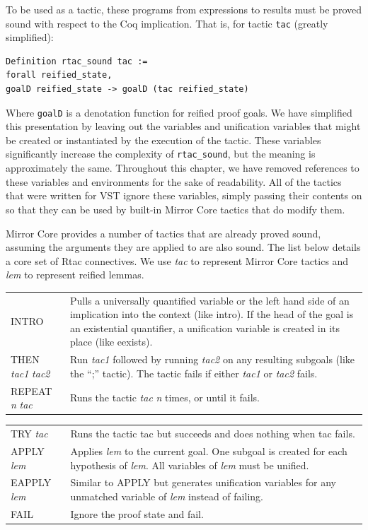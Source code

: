 \documentclass{puthesis}
\begin{document}
To be used as a tactic, these programs from expressions to results
must be proved sound with respect to the Coq implication. That is, for
tactic \lstinline|tac| (greatly simplified):

\begin{lstlisting}
Definition rtac_sound tac := 
forall reified_state,
goalD reified_state -> goalD (tac reified_state)
\end{lstlisting}

Where \lstinline|goalD| is a denotation function for reified proof
goals. We have simplified this presentation by leaving out the variables
and unification variables that might be created or instantiated by the
execution of the tactic. These variables significantly increase the
complexity of \lstinline|rtac_sound|, but the meaning is approximately
the same. Throughout this chapter, we have removed references to these
variables and environments for the sake of readability. All of the
tactics that were written for VST ignore these variables, simply
passing their contents on so that they can be used by built-in Mirror
Core tactics that do modify them. 

Mirror Core provides a number of tactics that are already proved
sound, assuming the arguments they are applied to are also sound.  The
list below details a core set of Rtac connectives. We use {\it tac} to
represent Mirror Core tactics and {\it lem} to represent reified
lemmas.

\vspace{5mm}

\noindent \begin{tabular}{l@{\quad\quad}p{90mm}}
{\sf INTRO} & Pulls a universally quantified variable or the left hand
side of an
implication into the context (like {\sf intro}). If the head of the goal is an existential
quantifier, a unification variable is created in its place (like {\sf
  eexists}). \\
{\sf THEN} {\it tac1} {\it tac2} & Run {\it tac1} followed by running {\it
  tac2} on any resulting subgoals (like the ``{\sf ;}'' tactic). The tactic fails if either 
  {\it tac1} or {\it tac2} fails.\\
{\sf REPEAT} {\it n} {\it tac} & Runs the tactic {\it tac} {\it n}
times, or until it fails. \\
\end{tabular}

\noindent \begin{tabular}{l@{\quad\quad}p{90mm}}
{\sf TRY} {\it tac} & Runs the tactic {\sf tac} but succeeds and does
nothing when {\sf tac} fails.\\
{\sf APPLY} {\it lem} & Applies {\it lem} to the current goal. One
subgoal is created for each hypothesis of {\it lem}. All variables of
{\it lem} must be unified.\\
{\sf EAPPLY} {\it lem} & Similar to {\sf APPLY} but generates
unification variables for any unmatched variable of {\it lem} instead
of failing. \\
{\sf FAIL} & Ignore the proof state and fail. \\ 
\end{tabular}
\end{document}
